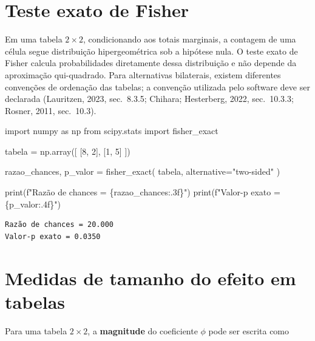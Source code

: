 \documentclass[
  letterpaper,
  DIV=11,
  numbers=noendperiod]{scrreprt}
\newenvironment{Shaded}{\begin{snugshade}}{\end{snugshade}}
\newcommand{\BuiltInTok}[1]{\textcolor[rgb]{0.00,0.23,0.31}{#1}}
\newcommand{\DecValTok}[1]{\textcolor[rgb]{0.68,0.00,0.00}{#1}}
\newcommand{\ImportTok}[1]{\textcolor[rgb]{0.00,0.46,0.62}{#1}}
\newcommand{\NormalTok}[1]{\textcolor[rgb]{0.00,0.23,0.31}{#1}}
\newcommand{\OperatorTok}[1]{\textcolor[rgb]{0.37,0.37,0.37}{#1}}
\newcommand{\SpecialCharTok}[1]{\textcolor[rgb]{0.37,0.37,0.37}{#1}}
\newcommand{\SpecialStringTok}[1]{\textcolor[rgb]{0.13,0.47,0.30}{#1}}
\newcommand{\StringTok}[1]{\textcolor[rgb]{0.13,0.47,0.30}{#1}}
\begin{document}
\section{Teste exato de Fisher}\label{teste-exato-de-fisher}

Em uma tabela \(2\times2\), condicionando aos totais marginais, a
contagem de uma célula segue distribuição hipergeométrica sob a hipótese
nula. O teste exato de Fisher calcula probabilidades diretamente dessa
distribuição e não depende da aproximação qui-quadrado. Para
alternativas bilaterais, existem diferentes convenções de ordenação das
tabelas; a convenção utilizada pelo software deve ser declarada
(Lauritzen, 2023, sec.~8.3.5; Chihara; Hesterberg, 2022, sec.~10.3.3;
Rosner, 2011, sec.~10.3).

\begin{Shaded}
\begin{Highlighting}[]
\ImportTok{import}\NormalTok{ numpy }\ImportTok{as}\NormalTok{ np}
\ImportTok{from}\NormalTok{ scipy.stats }\ImportTok{import}\NormalTok{ fisher\_exact}

\NormalTok{tabela }\OperatorTok{=}\NormalTok{ np.array([}
\NormalTok{    [}\DecValTok{8}\NormalTok{, }\DecValTok{2}\NormalTok{],}
\NormalTok{    [}\DecValTok{1}\NormalTok{, }\DecValTok{5}\NormalTok{]}
\NormalTok{])}

\NormalTok{razao\_chances, p\_valor }\OperatorTok{=}\NormalTok{ fisher\_exact(}
\NormalTok{    tabela,}
\NormalTok{    alternative}\OperatorTok{=}\StringTok{"two{-}sided"}
\NormalTok{)}

\BuiltInTok{print}\NormalTok{(}\SpecialStringTok{f"Razão de chances = }\SpecialCharTok{\{}\NormalTok{razao\_chances}\SpecialCharTok{:.3f\}}\SpecialStringTok{"}\NormalTok{)}
\BuiltInTok{print}\NormalTok{(}\SpecialStringTok{f"Valor{-}p exato = }\SpecialCharTok{\{}\NormalTok{p\_valor}\SpecialCharTok{:.4f\}}\SpecialStringTok{"}\NormalTok{)}
\end{Highlighting}
\end{Shaded}

\begin{verbatim}
Razão de chances = 20.000
Valor-p exato = 0.0350
\end{verbatim}

\section{Medidas de tamanho do efeito em
tabelas}\label{medidas-de-tamanho-do-efeito-em-tabelas}

Para uma tabela \(2\times2\), a \textbf{magnitude} do coeficiente
\(\phi\) pode ser escrita como
\end{document}
